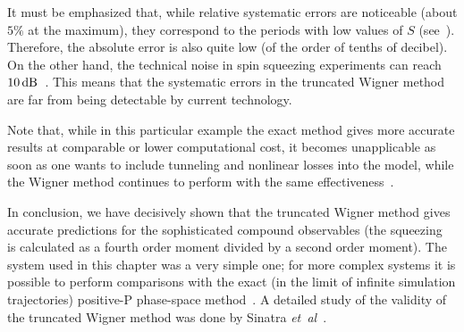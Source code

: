 It must be emphasized that, while relative systematic errors are noticeable (about $5\%$ at the maximum), they correspond to the periods with low values of $S$ (see~).
Therefore, the absolute error is also quite low (of the order of tenths of decibel).
On the other hand, the technical noise in spin squeezing experiments can reach $10\mbox{\ensuremath{\,\mathrm{dB}}}$~\cite{Riedel2010}.
This means that the systematic errors in the truncated Wigner method are far from being detectable by current technology.

Note that, while in this particular example the exact method gives more accurate results at comparable or lower computational cost, it becomes unapplicable as soon as one wants to include tunneling and nonlinear losses into the model, while the Wigner method continues to perform with the same effectiveness~\cite{Opanchuk2012a}.

In conclusion, we have decisively shown that the truncated Wigner method gives accurate predictions for the sophisticated compound observables (the squeezing~ is calculated as a fourth order moment divided by a second order moment).
The system used in this chapter was a very simple one; for more complex systems it is possible to perform comparisons with the exact (in the limit of infinite simulation trajectories) positive-P phase-space method~\cite{Drummond1993,Chaturvedi2002,Dechoum2004}.
A detailed study of the validity of the truncated Wigner method was done by Sinatra \textit{et~al}~\cite{Sinatra2002}.
